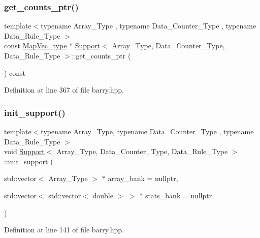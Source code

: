 \subsubsection{\texorpdfstring{get\+\_\+counts\+\_\+ptr()}{get\_counts\_ptr()}}
{\footnotesize\ttfamily template$<$typename Array\+\_\+\+Type , typename Data\+\_\+\+Counter\+\_\+\+Type , typename Data\+\_\+\+Rule\+\_\+\+Type $>$ \\
const \hyperlink{namespacebarry_a2f0d3aab1d67e4c8eaeab9022e16139f}{Map\+Vec\+\_\+type} $\ast$ \hyperlink{classbarry_1_1_support}{Support}$<$ Array\+\_\+\+Type, Data\+\_\+\+Counter\+\_\+\+Type, Data\+\_\+\+Rule\+\_\+\+Type $>$\+::get\+\_\+counts\+\_\+ptr (\begin{DoxyParamCaption}{ }\end{DoxyParamCaption}) const\hspace{0.3cm}{\ttfamily [inline]}}



Definition at line 367 of file barry.\+hpp.

\mbox{\label{classbarry_1_1_support_a013872a55ffd6a0a931e124da8e8dc99}} 
\subsubsection{\texorpdfstring{init\+\_\+support()}{init\_support()}}
{\footnotesize\ttfamily template$<$typename Array\+\_\+\+Type, typename Data\+\_\+\+Counter\+\_\+\+Type , typename Data\+\_\+\+Rule\+\_\+\+Type $>$ \\
void \hyperlink{classbarry_1_1_support}{Support}$<$ Array\+\_\+\+Type, Data\+\_\+\+Counter\+\_\+\+Type, Data\+\_\+\+Rule\+\_\+\+Type $>$\+::init\+\_\+support (\begin{DoxyParamCaption}\item[{std\+::vector$<$ Array\+\_\+\+Type $>$ $\ast$}]{array\+\_\+bank = {\ttfamily nullptr},  }\item[{std\+::vector$<$ std\+::vector$<$ double $>$ $>$ $\ast$}]{stats\+\_\+bank = {\ttfamily nullptr} }\end{DoxyParamCaption})\hspace{0.3cm}{\ttfamily [inline]}}



Definition at line 141 of file barry.\+hpp.

